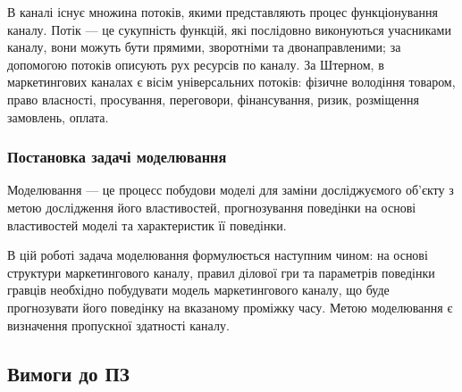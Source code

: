 В каналі існує множина потоків, якими представляють процес функціонування каналу. Потік --- це сукупність функцій, які послідовно виконуються учасниками каналу, вони можуть бути прямими, зворотніми та двонаправленими; за допомогою потоків описують рух ресурсів по каналу. За Штерном, в маркетингових каналах є вісім універсальних потоків\cite{stern}: фізичне володіння товаром, право власності, просування, переговори, фінансування, ризик, розміщення замовлень, оплата.

    \subsubsection{Постановка задачі моделювання}

Моделювання --- це процесс побудови моделі для заміни досліджуємого об’єкту з метою дослідження його властивостей, прогнозування поведінки на основі властивостей моделі та характеристик її поведінки\cite{model}.
 
В цій роботі задача моделювання формулюється наступним чином: на основі структури маркетингового каналу, правил ділової гри та параметрів поведінки гравців необхідно побудувати модель маркетингового каналу, що буде прогнозувати його поведінку на вказаному проміжку часу. Метою моделювання є визначення пропускної здатності каналу.


    \subsection{Вимоги до ПЗ}
